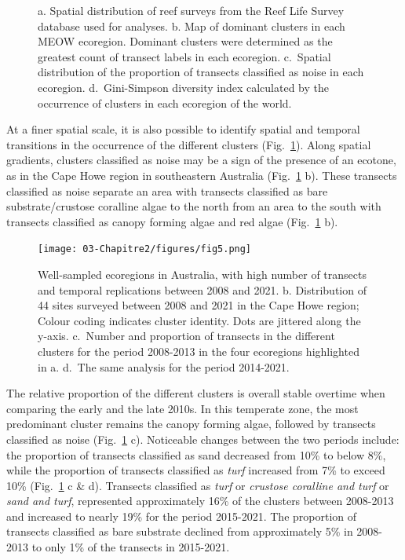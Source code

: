\begin{refsection}
\begin{figure}
\caption[]{a. Spatial distribution of reef surveys from the Reef Life
Survey database used for analyses. b. Map of dominant clusters in each
MEOW ecoregion. Dominant clusters were determined as the greatest count
of transect labels in each ecoregion. c.~Spatial distribution of the
proportion of transects classified as noise in each ecoregion.
d.~Gini-Simpson diversity index calculated by the occurrence of clusters
in each ecoregion of the world.}
\end{figure}

At a finer spatial scale, it is also possible to identify spatial and
temporal transitions in the occurrence of the different clusters
(Fig.~\ref{fig:chap2fig5}). Along spatial gradients, clusters classified
as noise may be a sign of the presence of an ecotone, as in the Cape
Howe region in southeastern Australia (Fig.~\ref{fig:chap2fig5} b).
These transects classified as noise separate an area with transects
classified as bare substrate/crustose coralline algae to the north from
an area to the south with transects classified as canopy forming algae
and red algae (Fig.~\ref{fig:chap2fig5} b).

\begin{figure}
\hypertarget{fig:chap2fig5}{%
\centering
\texttt{[image: 03-Chapitre2/figures/fig5.png]}
\caption[Well-sampled ecoregions in Australia, with high number of
transects and temporal replications between 2008 and 2021.]{Well-sampled ecoregions in Australia, with high number of
transects and temporal replications between 2008 and 2021. b.
Distribution of 44 sites surveyed between 2008 and 2021 in the Cape Howe
region; Colour coding indicates cluster identity. Dots are jittered
along the y-axis. c.~Number and proportion of transects in the different
clusters for the period 2008-2013 in the four ecoregions highlighted in
a. d.~The same analysis for the period 2014-2021.}\label{fig:chap2fig5}
}
\end{figure}

The relative proportion of the different clusters is overall stable
overtime when comparing the early and the late 2010s. In this temperate
zone, the most predominant cluster remains the canopy forming algae,
followed by transects classified as noise (Fig.~\ref{fig:chap2fig5} c).
Noticeable changes between the two periods include: the proportion of
transects classified as sand decreased from 10\% to below 8\%, while the
proportion of transects classified as \emph{turf} increased from 7\% to
exceed 10\% (Fig.~\ref{fig:chap2fig5} c \& d). Transects classified as
\emph{turf} or \emph{crustose coralline and turf} or \emph{sand and
turf}, represented approximately 16\% of the clusters between 2008-2013
and increased to nearly 19\% for the period 2015-2021. The proportion of
transects classified as bare substrate declined from approximately 5\%
in 2008-2013 to only 1\% of the transects in 2015-2021.


\end{refsection}
